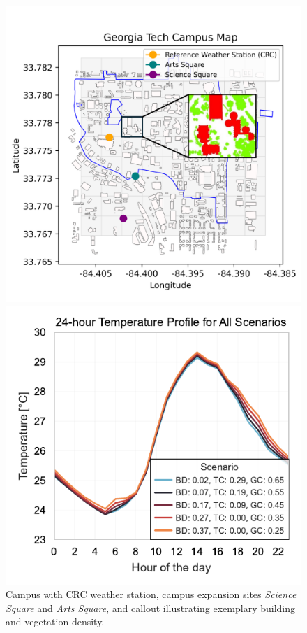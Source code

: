 \documentclass[a4paper, 12pt]{article}
\begin{document}
\begin{figure}[tbhp]
    \centering
    \begin{minipage}[b]{0.49\textwidth}
        \centering
        \includegraphics[width=\textwidth, trim = 0.45cm 0.80cm 0.40cm 2.7cm, clip = true]{Figures/georgia_tech_map_with_tiles.pdf}
        \caption{Campus with CRC weather station, campus expansion sites \textit{Science Square} and \textit{Arts Square}, and callout illustrating exemplary building and vegetation density.}
        \label{fig:campus-map}
    \end{minipage}
    \hfill
    \begin{minipage}[b]{0.49\textwidth}
        \centering
        \includegraphics[width=1\textwidth, trim = 0.1cm 0.1cm 0.1cm 0.68cm, clip = true]{Figures/Diurnal_Hottest_Month_July.pdf}

\end{minipage}
\end{figure}
\end{document}
